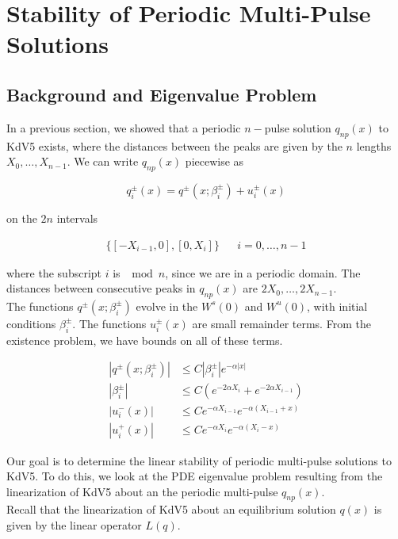 \documentclass[12pt]{article}
\begin{document}
\section{Stability of Periodic Multi-Pulse Solutions}

\subsection{Background and Eigenvalue Problem}

In a previous section, we showed that a periodic $n-$pulse solution $q_{np}(x)$ to KdV5 exists, where the distances between the peaks are given by the $n$ lengths $X_0, \dots, X_{n-1}$. We can write $q_{np}(x)$ piecewise as

\[
q_i^\pm(x) = q^\pm(x; \beta_i^\pm) + u_i^\pm(x)
\]

on the $2n$ intervals 

\begin{align*}
\{ [-X_{i-1}, 0], [0, X_i] \} && i = 0, \dots, n-1
\end{align*}

where the subscript $i$ is $\mod n$, since we are in a periodic domain. The distances between consecutive peaks in $q_{np}(x)$ are $2 X_0, \dots, 2 X_{n-1}$.\\

The functions $q^\pm(x; \beta_i^\pm)$ evolve in the $W^s(0)$ and $W^u(0)$, with initial conditions $\beta_i^\pm$. The functions $u_i^\pm(x)$ are small remainder terms. From the existence problem, we have bounds on all of these terms.

\begin{align*}
|q^\pm(x; \beta_i^\pm)| &\leq C |\beta_i^\pm| e^{-\alpha |x|} \\
|\beta_i^\pm| &\leq C (e^{-2 \alpha X_i} + e^{-2 \alpha X_{i-1}}) \\
|u_i^-(x)| &\leq C e^{-\alpha X_{i-1}} e^{-\alpha(X_{i-1} + x) } \\
|u_i^+(x)| &\leq C e^{-\alpha X_i} e^{-\alpha(X_i - x) } 
\end{align*}

Our goal is to determine the linear stability of periodic multi-pulse solutions to KdV5. To do this, we look at the PDE eigenvalue problem resulting from the linearization of KdV5 about an the periodic multi-pulse $q_{np}(x)$.\\

Recall that the linearization of KdV5 about an equilibrium solution $q(x)$ is given by the linear operator $L(q)$.
\end{document}

